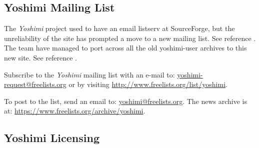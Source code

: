 \documentclass[
 11pt,
 twoside,
 a4paper,
 final                                 %
]{article}
\begin{document}
\subsection{Yoshimi Mailing List}
\label{subsec:introduction_mailing_list}

   The \textsl{Yoshimi} project used to have an email listserv at
   SourceForge, but the unreliability of the site has prompted a move to a
   new mailing list.  See reference \cite{yoshiminews}.  The team have
   managed to port across all the old yoshimi-user archives to this new
   site.  See reference \cite{yoshiminewsarchive}.

   Subscribe to the \textsl{Yoshimi} mailing list with an e-mail to:
   \url{yoshimi-request@freelists.org} or by visiting
   \url{http://www.freelists.org/list/yoshimi}.

   To post to the list, send an email to: \url{yoshimi@freelists.org}.
   The news archive is at: \url{https://www.freelists.org/archive/yoshimi}.

\subsection{Yoshimi Licensing}
\label{subsec:introduction_yoshimi_licensing}
\end{document}
